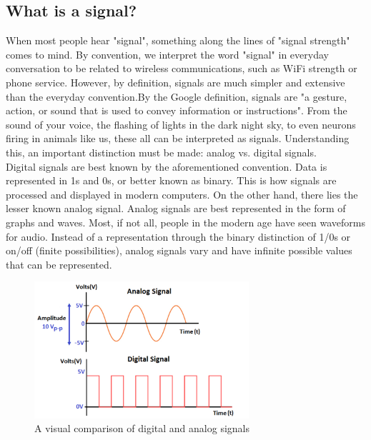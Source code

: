 \documentclass[11pt]{article}
\begin{document}
\subsection{What is a signal?}

When most people hear "signal", something along the lines of "signal strength" comes to mind. By convention, we interpret the word "signal" in everyday conversation to be related to wireless communications, such as WiFi strength or phone service. However, by definition, signals are much simpler and extensive than the everyday convention.By the Google definition, signals are "a gesture, action, or sound that is used to convey information or instructions". From the sound of your voice, the flashing of lights in the dark night sky, to even neurons firing in animals like us, these all can be interpreted as signals. Understanding this, an important distinction must be made: analog vs. digital signals.\\

Digital signals are best known by the aforementioned convention. Data is represented in 1s and 0s, or better known as binary. This is how signals are processed and displayed in modern computers. On the other hand, there lies the lesser known analog signal. Analog signals are best represented in the form of graphs and waves. Most, if not all, people in the modern age have seen waveforms for audio. Instead of a representation through the binary distinction of 1/0s or on/off (finite possibilities), analog signals vary and have infinite possible values that can be represented.

\begin{figure}[H]
    \begin{center}
    \includegraphics[width = 300px]{figures/analogVsDigital.png}
    \caption{A visual comparison of digital and analog signals \cite{website:digitalvsanalog}}
    \label{fig:analogVsDigital}
    \end{center} 
\end{figure}
\end{document}
